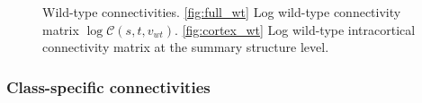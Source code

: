 \newpage

\begin{figure}[H]
\centering
        \newline
   \caption{Wild-type connectivities.
   \ref{fig:full_wt} Log wild-type connectivity matrix $\log \mathcal {C} (s,t,v_{wt})$.
   \ref{fig:cortex_wt} Log wild-type intracortical connectivity matrix at the summary structure level.}
   \label{fig:connectome}
\end{figure}

\newpage
\subsubsection{Class-specific connectivities}

